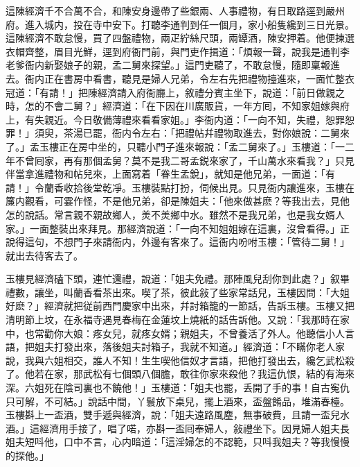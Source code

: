這陳經濟千不合萬不合，和陳安身邊帶了些銀兩、人事禮物，有日取路逕到嚴州府。進入城内，投在寺中安下。打聽李通判到任一個月，家小船隻纔到三日光景。這陳經濟不敢怠慢，買了四盤禮物，兩疋紵絲尺頭，兩罈酒，陳安押着。他便揀選衣帽齊整，眉目光鮮，逕到府衙門前，與門吏作揖道：「煩報一聲，說我是通判李老爹衙内新娶娘子的親，孟二舅來探望。」這門吏聽了，不敢怠慢，隨即稟報進去。衙内正在書房中看書，聽見是婦人兄弟，令左右先把禮物擡進來，一面忙整衣冠道：「有請！」把陳經濟請入府衙廳上，敘禮分賓主坐下，說道：「前日做親之時，怎的不會二舅？」經濟道：「在下因在川廣販貨，一年方囘，不知家姐嫁與府上，有失親近。今日敬備薄禮來看看家姐。」李衙内道：「一向不知，失禮，恕罪恕罪！」須臾，茶湯已罷，衙内令左右：「把禮帖幷禮物取進去，對你娘說：二舅來了。」孟玉樓正在房中坐的，只聽小門子進來報說：「孟二舅來了。」玉樓道：「一二年不曾囘家，再有那個孟舅？莫不是我二哥孟鋭來家了，千山萬水來看我？」只見伴當拿進禮物和帖兒來，上面寫着「眷生孟銳」，就知是他兄弟，一面道：「有請！」令蘭香收拾後堂乾凈。玉樓裝點打扮，伺候出見。只見衙内讓進來，玉樓在簾内觀看，可霎作怪，不是他兄弟，卻是陳姐夫：「他來做甚麽？等我出去，見他怎的說話。常言親不親故鄉人，羙不羙鄉中水。雖然不是我兄弟，也是我女婿人家。」一面整裝出來拜見。那經濟說道：「一向不知姐姐嫁在這裏，沒曾看得。」正說得這句，不想門子來請衙内，外邊有客來了。這衙内吩咐玉樓：「管待二舅！」就出去待客去了。

玉樓見經濟磕下頭，連忙還禮，說道：「姐夫免禮。那陣風兒刮你到此處？」叙畢禮數，讓坐，叫蘭香看茶出來。喫了茶，彼此敍了些家常話兒，玉樓因問：「大姐好麽？」經濟就把従前西門慶家中出來，幷討箱籠的一節話，告訴玉樓。玉樓又把清明節上坟，在永福寺遇見春梅在金蓮坟上燒紙的話告訴他。又說：「我那時在家中，也常勸你大娘：疼女兒，就疼女婿；親姐夫，不曾養活了外人。他聽信小人言語，把姐夫打發出來，落後姐夫討箱子，我就不知道。」經濟道：「不瞞你老人家說，我與六姐相交，誰人不知！生生喫他信奴才言語，把他打發出去，纔乞武松殺了。他若在家，那武松有七個頭八個膽，敢往你家來殺他？我這仇恨，結的有海來深。六姐死在陰司裏也不饒他！」玉樓道：「姐夫也罷，丢開了手的事！自古寃仇只可解，不可結。」說話中間，丫鬟放下桌兒，擺上酒來，盃盤餚品，堆滿春檯。玉樓斟上一盃酒，雙手遞與經濟，說：「姐夫遠路風塵，無事破費，且請一盃兒水酒。」這經濟用手接了，唱了喏，亦斟一盃囘奉婦人，敍禮坐下。因見婦人姐夫長姐夫短呌他，口中不言，心内暗道：「這淫婦怎的不認範，只呌我姐夫？等我慢慢的探他。」

